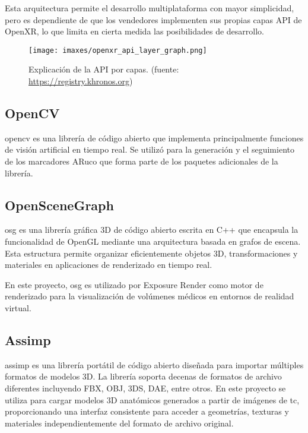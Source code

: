 Esta arquitectura permite el desarrollo multiplataforma con mayor simplicidad, pero es dependiente de que los vendedores implementen sus propias capas API de OpenXR, lo que limita en cierta medida las posibilidades de desarrollo. 

\begin{figure}
  \centering
  \texttt{[image: imaxes/openxr\_api\_layer\_graph.png]}
  \caption{Explicación de la API por capas. (fuente: \href{https://registry.khronos.org/OpenXR/specs/1.0/loader.html}{https://registry.khronos.org})}
  \label{fig:openxrapilayer}
\end{figure}

\subsection{OpenCV}
\acrfull{opencv} es una librería de código abierto que implementa principalmente funciones de visión artificial en tiempo real. Se utilizó para la generación y el seguimiento de los marcadores ARuco que forma parte de los paquetes adicionales de la librería.

\subsection{OpenSceneGraph}
\acrfull{osg} es una librería gráfica 3D de código abierto escrita en C++ que encapsula la funcionalidad de OpenGL mediante una arquitectura basada en grafos de escena. Esta estructura permite organizar eficientemente objetos 3D, transformaciones y materiales en aplicaciones de renderizado en tiempo real.

En este proyecto, \acrshort{osg} es utilizado por Exposure Render como motor de renderizado para la visualización de volúmenes médicos en entornos de realidad virtual.

\subsection{Assimp}
\acrfull{assimp} es una librería portátil de código abierto diseñada para importar múltiples formatos de modelos 3D. La librería soporta decenas de formatos de archivo diferentes incluyendo FBX, OBJ, 3DS, DAE, entre otros. En este proyecto se utiliza para cargar modelos 3D anatómicos generados a partir de imágenes de \acrshort{tc}, proporcionando una interfaz consistente para acceder a geometrías, texturas y materiales independientemente del formato de archivo original.

